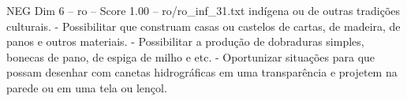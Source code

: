 \begin{textsample}{NEG Dim 6 – ro – Score 1.00 – ro/ro\_inf\_31.txt}
indígena ou de outras tradições culturais. - Possibilitar que construam casas ou castelos de cartas, de madeira, de panos e outros materiais. - Possibilitar a produção de dobraduras simples, bonecas de pano, de espiga de milho e etc. - Oportunizar situações para que possam desenhar com canetas hidrográficas em uma transparência e projetem na parede ou em uma tela ou lençol.

\end{textsample}
